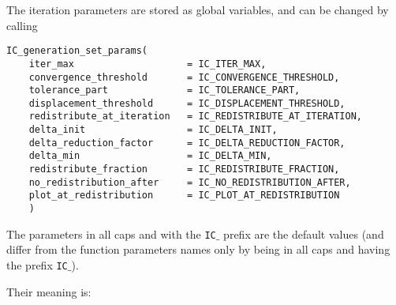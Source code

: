 The iteration parameters are stored as global variables, and can be changed by calling
\begin{lstlisting}
IC_generation_set_params(
	iter_max                    = IC_ITER_MAX,
	convergence_threshold       = IC_CONVERGENCE_THRESHOLD,
	tolerance_part              = IC_TOLERANCE_PART,
	displacement_threshold      = IC_DISPLACEMENT_THRESHOLD,
	redistribute_at_iteration   = IC_REDISTRIBUTE_AT_ITERATION,
	delta_init                  = IC_DELTA_INIT,
	delta_reduction_factor      = IC_DELTA_REDUCTION_FACTOR,
	delta_min                   = IC_DELTA_MIN,
	redistribute_fraction       = IC_REDISTRIBUTE_FRACTION,
	no_redistribution_after     = IC_NO_REDISTRIBUTION_AFTER,
	plot_at_redistribution      = IC_PLOT_AT_REDISTRIBUTION
	)
\end{lstlisting}

The parameters in all caps and with the \texttt{IC$\_$} prefix are the default values (and differ from the function parameters names only by being in all caps and having the prefix \texttt{IC$\_$}). 

Their meaning is:

